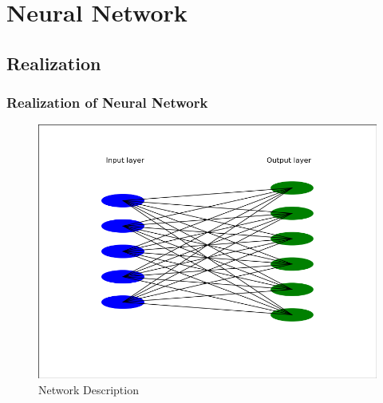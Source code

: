 \documentclass{beamer}
\newenvironment{reference}[2]{%
  \flushright\begin{textblock*}{\textwidth}(#1,#2) 
      \tiny\it\bgroup\color{gray!60!white}}{\egroup\end{textblock*}}
\begin{document}
\section{Neural Network} 
\subsection{Realization}
\begin{frame}\frametitle{Realization of Neural Network}
\begin{figure}
   \includegraphics[scale=0.4]{fig/network}
   \caption{Network Description}
  \end{figure}
\end{frame}

\end{document}
